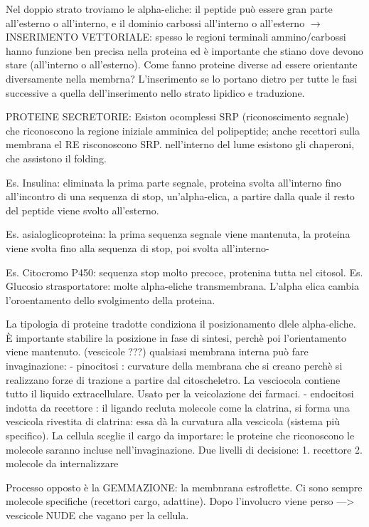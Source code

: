 \documentclass[a4paper,12pt]{article}
\newcommand{\lfreccia}{\ensuremath{\longrightarrow}}
\begin{document}
Nel doppio strato troviamo le alpha-eliche: il peptide può essere gran parte all'esterno o all'interno, e il dominio carbossi all'interno o all'esterno \lfreccia INSERIMENTO VETTORIALE: spesso le regioni terminali ammino/carbossi hanno funzione ben precisa nella proteina ed è importante che stiano dove devono stare (all'interno o all'esterno).
Come fanno proteine diverse ad essere orientante diversamente nella membrna?
L'inserimento se lo portano dietro per tutte le fasi successive a quella dell'inserimento nello strato lipidico e traduzione.

PROTEINE SECRETORIE: 
Esiston ocomplessi SRP (riconoscimento segnale) che riconoscono la regione iniziale amminica del polipeptide; anche recettori sulla membrana el RE risconoscono SRP.
nell'interno del lume esistono gli chaperoni, che assistono il folding.

Es. Insulina: eliminata la prima parte segnale, proteina svolta all'interno fino all'incontro di una sequenza di stop, un'alpha-elica, a partire dalla quale il resto del peptide viene svolto all'esterno.

Es. asialoglicoproteina: la prima sequenza segnale viene mantenuta, la proteina viene svolta fino alla sequenza di stop, poi svolta all'interno-

Es. Citocromo P450: sequenza stop molto precoce, protenina tutta nel citosol.
Es. Glucosio strasportatore: molte alpha-eliche transmembrana. L'alpha elica cambia l'oroentamento dello svolgimento della proteina.

La tipologia di proteine tradotte condiziona il posizionamento dlele alpha-eliche. È importante stabilire la posizione in fase di sintesi, perchè poi l'orientamento viene mantenuto. (vescicole ???)
qualsiasi membrana interna può fare invaginazione:
- pinocitosi : curvature della membrana che si creano perchè si realizzano forze di trazione a partire dal citoscheletro. La vesciocola contiene tutto il liquido extracellulare. Usato per la veicolazione dei farmaci.
- endocitosi indotta da recettore : il ligando recluta molecole come la clatrina, si forma una vescicola rivestita di clatrina: essa dà la curvatura alla vescicola (sistema più specifico). La cellula sceglie il cargo da importare: le proteine che riconoscono le molecole saranno incluse nell'invaginazione. Due livelli di decisione:
1. recettore
2. molecole da internalizzare

Processo opposto è la GEMMAZIONE: la membnrana estroflette. Ci sono sempre molecole specifiche (recettori cargo, adattine). Dopo l'involucro viene perso ---> vescicole NUDE che vagano per la cellula.
\end{document}
